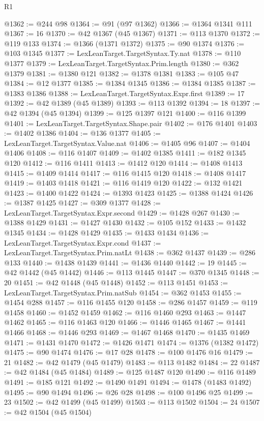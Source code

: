 \begin{lexlean}{R1}
\begin{coremodule}
@1362 := @244 @98
@1364 := @91 (@97 @1362)
@1366 := @1364 @1341 @111
@1367 := 16
@1370 := @42 @1367 (@45 @1367)
@1371 := @113 @1370
@1372 := @119 @133
@1374 := @1366 (@1371 @1372)
@1375 := @90 @1374
@1376 := @103 @1345
@1377 := LexLeanTarget.TargetSyntax.Ty.nat
@1378 := @110 @1377
@1379 := LexLeanTarget.TargetSyntax.Prim.length
@1380 := @362 @1379
@1381 := @1380 @121
@1382 := @1378 @1381
@1383 := @105 @47
@1384 := @12 @1377
@1385 := @1384 @1345
@1386 := @1384 @1385
@1387 := @1383 @1386
@1388 := LexLeanTarget.TargetSyntax.Expr.first
@1389 := 17
@1392 := @42 @1389 (@45 @1389)
@1393 := @113 @1392
@1394 := 18
@1397 := @42 @1394 (@45 @1394)
@1399 := @125 @1397 @121
@1400 := @116 @1399
@1401 := LexLeanTarget.TargetSyntax.Shape.pair
@1402 := @176 @1401
@1403 := @1402 @1386
@1404 := @136 @1377
@1405 := LexLeanTarget.TargetSyntax.Value.nat
@1406 := @1405 @96
@1407 := @1404 @1406
@1408 := @116 @1407
@1409 := @1402 @1385
@1411 := @182 @1345 @120
@1412 := @116 @1411
@1413 := @1412 @120
@1414 := @1408 @1413
@1415 := @1409 @1414
@1417 := @116 @1415 @120
@1418 := @1408 @1417
@1419 := @1403 @1418
@1421 := @116 @1419 @120
@1422 := @132 @1421
@1423 := @1400 @1422
@1424 := @1393 @1423
@1425 := @1388 @1424
@1426 := @1387 @1425
@1427 := @309 @1377
@1428 := LexLeanTarget.TargetSyntax.Expr.second
@1429 := @1428 @267
@1430 := @1388 @1429
@1431 := @1427 @1430
@1432 := @105 @152
@1433 := @1432 @1345
@1434 := @1428 @1429
@1435 := @1433 @1434
@1436 := LexLeanTarget.TargetSyntax.Expr.cond
@1437 := LexLeanTarget.TargetSyntax.Prim.natLt
@1438 := @362 @1437
@1439 := @286 @133
@1440 := @1438 @1439
@1441 := @1436 @1440
@1442 := 19
@1445 := @42 @1442 (@45 @1442)
@1446 := @113 @1445
@1447 := @370 @1345
@1448 := 20
@1451 := @42 @1448 (@45 @1448)
@1452 := @113 @1451
@1453 := LexLeanTarget.TargetSyntax.Prim.natSub
@1454 := @362 @1453
@1455 := @1454 @288
@1457 := @116 @1455 @120
@1458 := @286 @1457
@1459 := @119 @1458
@1460 := @1452 @1459
@1462 := @116 @1460 @293
@1463 := @1447 @1462
@1465 := @116 @1463 @120
@1466 := @1446 @1465
@1467 := @1441 @1466
@1468 := @1446 @293
@1469 := @1467 @1468
@1470 := @1435 @1469
@1471 := @1431 @1470
@1472 := @1426 @1471
@1474 := @1376 (@1382 @1472)
@1475 := @90 @1474
@1476 := @17 @28
@1478 := @100 @1476 @16
@1479 := 21
@1482 := @42 @1479 (@45 @1479)
@1483 := @113 @1482
@1484 := 22
@1487 := @42 @1484 (@45 @1484)
@1489 := @125 @1487 @120
@1490 := @116 @1489
@1491 := @185 @121
@1492 := @1490 @1491
@1494 := @1478 (@1483 @1492)
@1495 := @90 @1494
@1496 := @26 @28
@1498 := @100 @1496 @25
@1499 := 23
@1502 := @42 @1499 (@45 @1499)
@1503 := @113 @1502
@1504 := 24
@1507 := @42 @1504 (@45 @1504)

\end{coremodule}
\end{lexlean}
